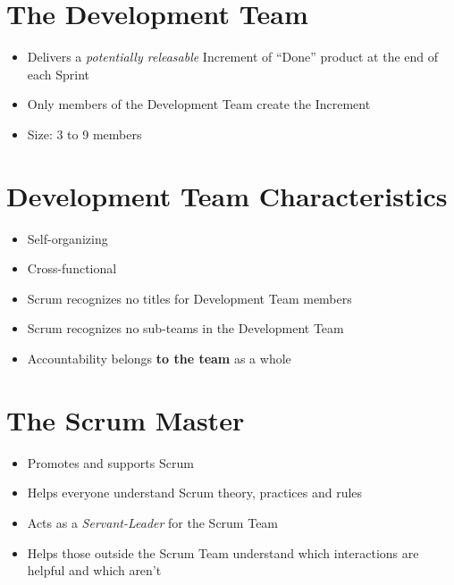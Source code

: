 \documentclass[a4paper,11pt,twocolumn]{article}
\begin{document}
\section*{The Development Team}
\begin{itemize}
	\item Delivers a \textit{potentially releasable} Increment of ``Done'' product at the end of each Sprint 
	\item Only members of the Development Team create the Increment
    \item Size: 3 to 9 members
\end{itemize}

\section*{Development Team Characteristics}
\begin{itemize}
    \item Self-organizing
    \item Cross-functional
	\item Scrum recognizes no titles for Development Team members
	\item Scrum recognizes no sub-teams in the Development Team
	\item Accountability belongs \textbf{to the team} as a whole
\end{itemize}

\section*{The Scrum Master}
\begin{itemize}
    \item Promotes and supports Scrum
    \item Helps everyone understand Scrum theory, practices and rules 
    \item Acts as a \textit{Servant-Leader} for the Scrum Team
    \item Helps those outside the Scrum Team understand which interactions are helpful and which aren't
\end{itemize}
\end{document}
